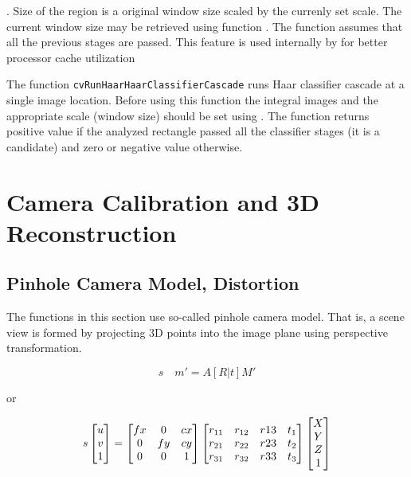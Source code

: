 
\begin{description}
. Size of the region is a original window size scaled by the currenly set scale. The current window size may be retrieved using  function
. The function assumes that all the previous stages are passed. This feature is used internally by  for better processor cache utilization
\end{description}

The function \texttt{cvRunHaarHaarClassifierCascade} runs Haar classifier
cascade at a single image location. Before using this function the
integral images and the appropriate scale (window size) should be set
using . The function returns
positive value if the analyzed rectangle passed all the classifier stages
(it is a candidate) and zero or negative value otherwise.

\section{Camera Calibration and 3D Reconstruction}

\subsection{Pinhole Camera Model, Distortion}

The functions in this section use so-called pinhole camera model. That
is, a scene view is formed by projecting 3D points into the image plane
using perspective transformation.

\[
s \quad m' = A [R|t] M'
\]

or

\[
s \begin{bmatrix} u\\ v\\ 1 \end{bmatrix} = \begin{bmatrix} fx & 0 & cx\\ 0 & fy & cy\\ 0 & 0 & 1 \end{bmatrix}
\begin{bmatrix}
 r_{11} & r_{12} & r{13} & t_1 \\
 r_{21} & r_{22} & r{23} & t_2 \\
 r_{31} & r_{32} & r{33} & t_3
\end{bmatrix}
\begin{bmatrix}X\\Y\\Z\\1 \end{bmatrix}
\]

